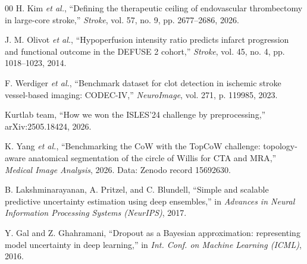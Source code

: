 \documentclass[conference]{IEEEtran}
\begin{document}
\begin{thebibliography}{00}
 H. Kim \emph{et al.}, ``Defining the therapeutic ceiling of endovascular thrombectomy in large-core stroke,'' \emph{Stroke}, vol. 57, no. 9, pp. 2677--2686, 2026.

 J. M. Olivot \emph{et al.}, ``Hypoperfusion intensity ratio predicts infarct progression and functional outcome in the DEFUSE 2 cohort,'' \emph{Stroke}, vol. 45, no. 4, pp. 1018--1023, 2014.

 F. Werdiger \emph{et al.}, ``Benchmark dataset for clot detection in ischemic stroke vessel-based imaging: CODEC-IV,'' \emph{NeuroImage}, vol. 271, p. 119985, 2023.

 Kurtlab team, ``How we won the ISLES'24 challenge by preprocessing,'' arXiv:2505.18424, 2026.

 K. Yang \emph{et al.}, ``Benchmarking the CoW with the TopCoW challenge: topology-aware anatomical segmentation of the circle of Willis for CTA and MRA,'' \emph{Medical Image Analysis}, 2026. Data: Zenodo record 15692630.

 B. Lakshminarayanan, A. Pritzel, and C. Blundell, ``Simple and scalable predictive uncertainty estimation using deep ensembles,'' in \emph{Advances in Neural Information Processing Systems (NeurIPS)}, 2017.

 Y. Gal and Z. Ghahramani, ``Dropout as a Bayesian approximation: representing model uncertainty in deep learning,'' in \emph{Int. Conf. on Machine Learning (ICML)}, 2016.

\end{thebibliography}
\end{document}
